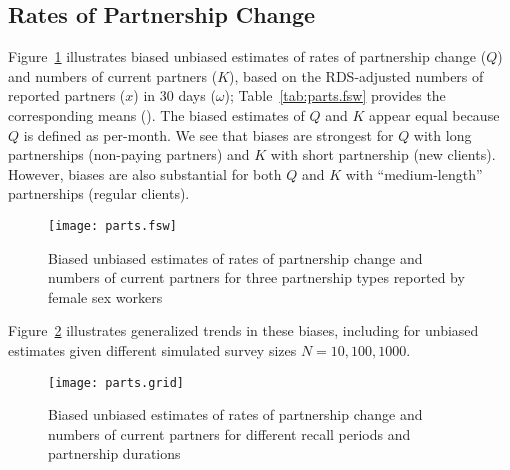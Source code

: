 \subsection{Rates of Partnership Change}\label{res.parts}
Figure~\ref{fig:parts.fsw} illustrates biased \vs unbiased estimates of
rates of partnership change ($Q$) and numbers of current partners ($K$),
based on the RDS-adjusted numbers of reported partners ($x$) in 30 days ($\omega$);
Table~\ref{tab:parts.fsw} provides the corresponding means (\ci).
The biased estimates of $Q$ and $K$ appear equal because $Q$ is defined as per-month.
We see that biases are strongest for
$Q$ with long partnerships (\eg non-paying partners) and
$K$ with short partnership (\eg new clients).
However, biases are also substantial for
both $Q$ and $K$ with ``medium-length'' partnerships (\eg regular clients).
\begin{figure}
  \centering\texttt{[image: parts.fsw]}
  \caption{Biased \vs unbiased estimates of
    rates of partnership change and numbers of current partners
    for three partnership types reported by female sex workers}
  \label{fig:parts.fsw}
\end{figure}
\par
Figure~\ref{fig:parts.grid} illustrates generalized trends in these biases,
including \ci for unbiased estimates given different simulated survey sizes $N = 10, 100, 1000$.
\begin{figure}
  \centering\texttt{[image: parts.grid]}
  \caption{Biased \vs unbiased estimates of
    rates of partnership change and numbers of current partners
    for different recall periods and partnership durations}
  \label{fig:parts.grid}
\end{figure}
